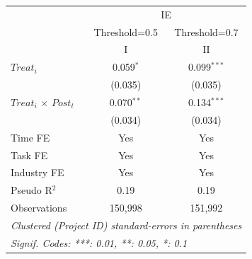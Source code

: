 \documentclass[
]{article}
\begin{document}
\begin{tabular}{lcc}
   \toprule
    & \multicolumn{2}{c}{IE}\\
                                & Threshold=0.5 & Threshold=0.7 \\   
   \midrule & I & II\\
   \midrule 
   $Treat_i$                    & 0.059$^{*}$   & 0.099$^{***}$\\   
                                & (0.035)       & (0.035)\\   
   $Treat_i$ $\times$ $Post_t$  & 0.070$^{**}$  & 0.134$^{***}$\\   
                                & (0.034)       & (0.034)\\   
   \midrule 
   Time FE                      & Yes           & Yes\\  
   Task FE                      & Yes           & Yes\\  
   Industry FE                  & Yes           & Yes\\  
   Pseudo R$^2$                 & 0.19          & 0.19\\  
   Observations                 & 150,998       & 151,992\\  
   \midrule
   \multicolumn{3}{l}{\emph{Clustered (Project ID) standard-errors in parentheses}}\\
   \multicolumn{3}{l}{\emph{Signif. Codes: ***: 0.01, **: 0.05, *: 0.1}}\\
\end{tabular}
\par\endgroup
\end{document}
